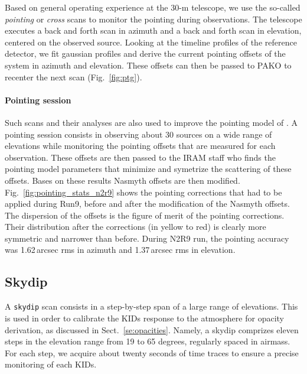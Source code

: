 Based on general operating experience at the 30-m telescope, we use the so-called
{\em pointing} or {\em cross} scans to monitor the pointing during observations. The
telescope executes a back and forth scan in azimuth and a back and forth scan in
elevation, centered on the observed source. Looking at the timeline profiles of
the reference detector, we fit gaussian profiles and derive the current pointing
offsets of the system in azimuth and elevation. These offsets can then be passed
to PAKO to recenter the next scan (Fig.~\ref{fig:ptg}).

\paragraph{Pointing session}
\label{se:pointing_session}

Such scans and their analyses are also used to improve the pointing model of
\nika. A pointing session consists in observing about 30 sources on a wide range
of elevations while monitoring the pointing offsets that are measured for each
observation. These offsets are then passed to the IRAM staff who finds the
pointing model parameters that minimize and symetrize the scattering of these
offsets. Bases on these results Nasmyth offsets are then
modified. Fig.~\ref{fig:pointing_stats_n2r9} shows the pointing corrections that
had to be applied during Run9, before and after the modification of the Nasmyth
offsets. The dispersion of the offsets is the figure of merit of the pointing
corrections. Their distribution after the corrections (in yellow to
red) is clearly more symmetric and narrower than before. During N2R9 run, the
pointing accuracy was 1.62\,arcsec rms in azimuth and 1.37\,arcsec rms in
elevation.

\subsection{Skydip}
\label{se:skydip}

A {\tt skydip} scan consists in a step-by-step span of a large range
of elevations.  This is used in order to calibrate the KIDs response
to the atmosphere for opacity derivation, as discussed in
Sect.~\ref{se:opacities}.  Namely, a skydip comprizes eleven steps in
the elevation range from 19 to 65 degrees, regularly spaced in
airmass. For each step, we acquire about twenty seconds of time traces
to ensure a precise monitoring of each KIDs.


